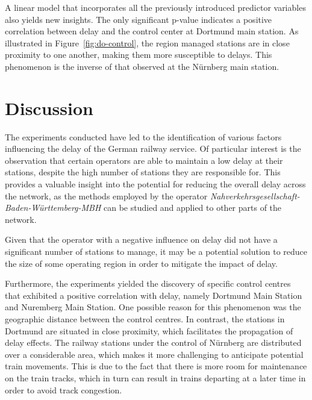 \documentclass[12pt,a4paper]{article}
\begin{document}
A linear model that incorporates all the previously introduced predictor variables also yields new insights. 
The only significant p-value indicates a positive correlation between delay and the control center at Dortmund main station. 
As illustrated in Figure~\ref{fig:do-control}, the region managed stations are in close proximity to one another, making them more susceptible to delays. 
This phenomenon is the inverse of that observed at the Nürnberg main station.

\maketitle
\section{\label{sec:Discussion}Discussion}

The experiments conducted have led to the identification of various factors influencing the delay of the German railway service. 
Of particular interest is the observation that certain operators are able to maintain a low delay at their stations, despite the high number of stations they are responsible for. 
This provides a valuable insight into the potential for reducing the overall delay across the network, as the methods employed by the operator \textit{Nahverkehrsgesellschaft-Baden-Württemberg-MBH} can be studied and applied to other parts of the network. 

Given that the operator with a negative influence on delay did not have a significant number of stations to manage, it may be a potential solution to reduce the size of some operating region in order to mitigate the impact of delay. 

Furthermore, the experiments yielded the discovery of specific control centres that exhibited a positive correlation with delay, namely Dortmund Main Station and Nuremberg Main Station. 
One possible reason for this phenomenon was the geographic distance between the control centres. In contrast, the stations in Dortmund are situated in close proximity, which facilitates the propagation of delay effects. 
The railway stations under the control of Nürnberg are distributed over a considerable area, which makes it more challenging to anticipate potential train movements. 
This is due to the fact that there is more room for maintenance on the train tracks, which in turn can result in trains departing at a later time in order to avoid track congestion. 
\end{document}
